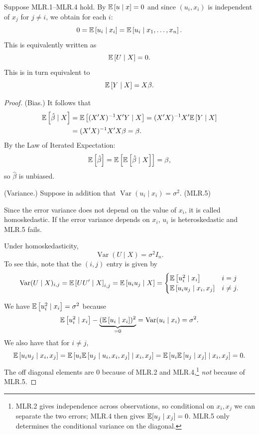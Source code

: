 \begin{proposition}	Suppose MLR.1--MLR.4 hold. By $\mathbb{E}\left[u\mid x\right] =0$ and since $(u_i,x_i)$ is independent of $x_j$ for $j\neq i$, we obtain for each $i$:
	\[
		0=\mathbb{E}\left[u_i\mid x_i\right]=\mathbb{E}\left[u_i\mid x_1,\ldots,x_n\right].
	\]
	This is equivalently written as
	\[
		\mathbb{E}\left[U\mid X\right]=0.
	\]
	This is in turn equivalent to
	\[
		\mathbb{E}\left[Y\mid X\right]=X\beta.
	\]
\end{proposition}
\begin{proof}
	(Bias.) It follows that
	\begin{align*}
		\mathbb{E}\left[\hat\beta\mid X\right]
		&=\mathbb{E}\left[(X'X)^{-1}X'Y\mid X\right]=(X'X)^{-1}X'\mathbb{E}\left[Y\mid X\right] \\
		&=(X'X)^{-1}X'X\beta=\beta.
	\end{align*}
	By the Law of Iterated Expectation:
	\[
		\mathbb{E}\left[\hat\beta\right]=\mathbb{E}\left[\mathbb{E}\left[\hat\beta\mid X\right]\right]=\beta,
	\]
	so $\hat\beta$ is unbiased.

	(Variance.) Suppose in addition that $\operatorname{Var}(u_i\mid x_i)=\sigma^2$. (MLR.5)

	Since the error variance does not depend on the value of $x_i$, it is called homoskedastic. If the error variance depends on $x_i$, $u_i$ is heteroskedastic and MLR.5 fails.

	Under homoskedasticity,
	\[
		\operatorname{Var}(U\mid X)=\sigma^2I_n.
	\]
	To see this, note that the $(i,j)$ entry is given by
	\[
		\operatorname{Var}(U\mid X)_{i,j}=\mathbb{E}\left[UU'\mid X\right]_{i,j}=\mathbb{E}\left[u_iu_j\mid X\right]=
		\begin{cases}
			\mathbb{E}\left[u_i^2\mid x_i\right]      & i=j      \\
			\mathbb{E}\left[u_iu_j\mid x_i,x_j\right] & i\neq j.
		\end{cases}
	\]

	We have $\mathbb{E}\left[u_i^2\mid x_i\right]=\sigma^2$ because
	\[
		\mathbb{E}\left[u_i^2\mid x_i\right]-\underbrace{(\mathbb{E}\left[u_i\mid x_i\right])^2}_{=0}=\operatorname{Var}(u_i\mid x_i)=\sigma^2.
	\]
	We also have that for $i\ne j$,
	\[
		\mathbb{E}\left[u_iu_j\mid x_i,x_j\right]=\mathbb{E}\left[u_i\mathbb{E}\left[u_j\mid u_i,x_i,x_j\right]\mid x_i,x_j\right]=\mathbb{E}\left[u_i\mathbb{E}\left[u_j\mid x_j\right]\mid x_i,x_j\right]=0.
		\] The off diagonal elements are $0$ because of MLR.2 and MLR.4,\footnote{MLR.2 gives independence across observations, so conditional on $x_i,x_j$ we can separate the two errors; MLR.4 then gives $\mathbb{E}[u_j\mid x_j]=0$. MLR.5 only determines the conditional variance on the diagonal.} \emph{not} because of MLR.5.


\end{proof}

